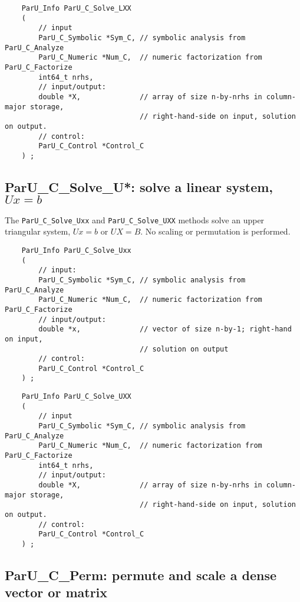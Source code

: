 \documentclass[12pt]{article}
\begin{document}
    {\footnotesize
    \begin{verbatim}
    ParU_Info ParU_C_Solve_LXX
    (
        // input
        ParU_C_Symbolic *Sym_C, // symbolic analysis from ParU_C_Analyze
        ParU_C_Numeric *Num_C,  // numeric factorization from ParU_C_Factorize
        int64_t nrhs,
        // input/output:
        double *X,              // array of size n-by-nrhs in column-major storage,
                                // right-hand-side on input, solution on output.
        // control:
        ParU_C_Control *Control_C
    ) ; \end{verbatim} }

\subsection{{\sf ParU\_C\_Solve\_U*}: solve a linear system, $Ux=b$}

    The \verb'ParU_C_Solve_Uxx' and \verb'ParU_C_Solve_UXX' methods solve an
    upper triangular system, $Ux=b$ or $UX=B$.  No scaling or permutation is
    performed.

    {\footnotesize
    \begin{verbatim}
    ParU_Info ParU_C_Solve_Uxx
    (
        // input:
        ParU_C_Symbolic *Sym_C, // symbolic analysis from ParU_C_Analyze
        ParU_C_Numeric *Num_C,  // numeric factorization from ParU_C_Factorize
        // input/output:
        double *x,              // vector of size n-by-1; right-hand on input,
                                // solution on output
        // control:
        ParU_C_Control *Control_C
    ) ; \end{verbatim} }

    {\footnotesize
    \begin{verbatim}
    ParU_Info ParU_C_Solve_UXX
    (
        // input
        ParU_C_Symbolic *Sym_C, // symbolic analysis from ParU_C_Analyze
        ParU_C_Numeric *Num_C,  // numeric factorization from ParU_C_Factorize
        int64_t nrhs,
        // input/output:
        double *X,              // array of size n-by-nrhs in column-major storage,
                                // right-hand-side on input, solution on output.
        // control:
        ParU_C_Control *Control_C
    ) ; \end{verbatim} }

\subsection{{\sf ParU\_C\_Perm}: permute and scale a dense vector or matrix}
\end{document}
